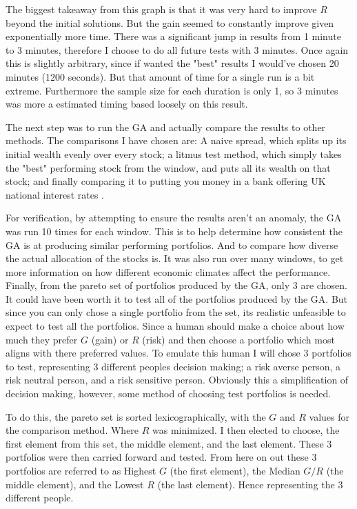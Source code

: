 \documentclass[11pt]{article}
\begin{document}
    The biggest takeaway from this graph is that it was very hard to improve \(R\) beyond
    the initial solutions. But the gain seemed to constantly improve given exponentially
    more time. There was a significant jump in results from 1 minute to 3 minutes,
    therefore I choose to do all future tests with 3 minutes. Once again this is slightly
    arbitrary, since if wanted the "best" results I would've chosen 20 minutes (1200 seconds).
    But that amount of time for a single run is a bit extreme. Furthermore the sample size for
    each duration is only 1, so 3 minutes was more a estimated timing based loosely
    on this result.

    The next step was to run the GA and actually compare the results to other methods.
    The comparisons I have chosen are: A naive spread, which splits up its initial wealth
    evenly over every stock; a litmus test method, which simply takes the "best" performing
    stock from the window, and puts all its wealth on that stock; and finally
    comparing it to putting you money in a bank offering UK national interest rates
    \cite{BankOfE}.

    For verification, by attempting to ensure the results aren't an anomaly, the GA was run 10
    times for each window. This is to help determine how consistent the GA is at producing
    similar performing portfolios. And to compare how diverse the actual allocation
    of the stocks is. It was also run over many windows, to get more information
    on how different economic climates affect the performance. Finally, from the pareto
    set of portfolios produced by the GA, only 3 are chosen. It could have been worth
    it to test all of the portfolios produced by the GA. But since you can only
    chose a single portfolio from the set, its realistic unfeasible to expect to
    test all the portfolios. Since a human should make a choice about how much
    they prefer \(G\) (gain) or \(R\) (risk) and then choose a portfolio which most
    aligns with there preferred values. To emulate this human I will chose 3
    portfolios to test, representing 3 different peoples decision making; a risk
    averse person, a risk neutral person, and a risk sensitive person. Obviously
    this a simplification of decision making, however, some method of choosing
    test portfolios is needed.

    To do this, the pareto set is sorted lexicographically, with the \(G\) and \(R\)
    values for the comparison method. Where \(R\) was minimized. I then elected to choose,
    the first element from this set, the middle element, and the last element.
    These 3 portfolios were then carried forward and tested. From here on out
    these 3 portfolios are referred to as Highest \(G\) (the first element),
    the Median \(G/R\) (the middle element), and the Lowest \(R\) (the last element).
    Hence representing the 3 different people.
\end{document}

